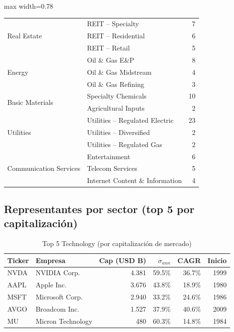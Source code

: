 \begin{table}[H]
\begin{adjustbox}{max width=0.78\textwidth}
\begin{tabular}{@{}llr@{}}
    \midrule
    \multirow{3}{*}{Real Estate}
      & REIT -- Specialty               &  7 \\
      & REIT -- Residential             &  6 \\
      & REIT -- Retail                  &  5 \\
    \midrule
    \multirow{3}{*}{Energy}
      & Oil \& Gas E\&P                 &  8 \\
      & Oil \& Gas Midstream            &  4 \\
      & Oil \& Gas Refining             &  3 \\
    \midrule
    \multirow{2}{*}{Basic Materials}
      & Specialty Chemicals             & 10 \\
      & Agricultural Inputs             &  2 \\
    \midrule
    \multirow{3}{*}{Utilities}
      & Utilities -- Regulated Electric & 23 \\
      & Utilities -- Diversified        &  2 \\
      & Utilities -- Regulated Gas      &  2 \\
    \midrule
    \multirow{3}{*}{Communication Services}
      & Entertainment                   &  6 \\
      & Telecom Services                &  5 \\
      & Internet Content \& Information &  4 \\
    \bottomrule
  \end{tabular}
  \end{adjustbox}
\end{table}

\subsection*{Representantes por sector (top 5 por capitalización)}

\begin{table}[H]
  \centering
  \caption{Top 5 Technology (por capitalización de mercado)}
  \small
  \begin{tabular}{llrrrr}
    \toprule
    \textbf{Ticker} & \textbf{Empresa} & \textbf{Cap (USD B)}
                    & \textbf{$\sigma_{ann}$} & \textbf{CAGR} & \textbf{Inicio} \\
    \midrule
    NVDA & NVIDIA Corp.      & 4.381 & 59.5\% & 36.7\% & 1999 \\
    AAPL & Apple Inc.        & 3.676 & 43.8\% & 18.9\% & 1980 \\
    MSFT & Microsoft Corp.   & 2.940 & 33.2\% & 24.6\% & 1986 \\
    AVGO & Broadcom Inc.     & 1.527 & 37.9\% & 40.6\% & 2009 \\
    MU   & Micron Technology &   480 & 60.3\% & 14.8\% & 1984 \\
    \bottomrule
  \end{tabular}
\end{table}

